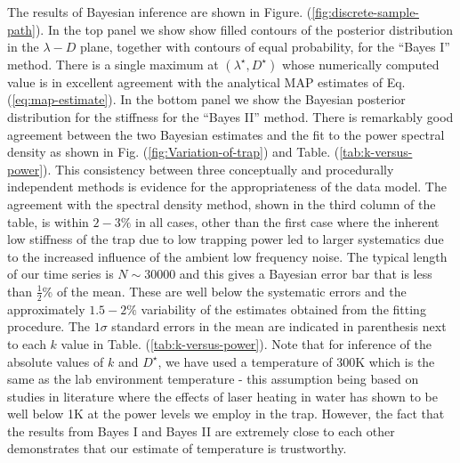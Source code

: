 \documentclass[english,aps, twocolumn, pre,superscriptaddress]{revtex4-1}
\begin{document}
The results of Bayesian inference are shown in Figure. (\ref{fig:discrete-sample-path}).
In the top panel we show show filled contours of the posterior distribution
in the $\lambda-D$ plane, together with contours of equal probability,
for the ``Bayes I'' method. There is a single maximum at $(\lambda^{\star},D^{\star})$
whose numerically computed value is in excellent agreement with the
analytical MAP estimates of Eq.(\ref{eq:map-estimate}). In the bottom
panel we show the Bayesian posterior distribution for the stiffness
for the ``Bayes II'' method. There is remarkably good agreement
between the two Bayesian estimates and the fit to the power spectral
density as shown in Fig. (\ref{fig:Variation-of-trap}) and Table.
(\ref{tab:k-versus-power}). This consistency between three conceptually
and procedurally independent methods is evidence for the appropriateness
of the data model. The agreement with the spectral density method,
shown in the third column of the table, is within $2-3\%$ in all
cases, other than the first case where the inherent low stiffness
of the trap due to low trapping power led to larger systematics due
to the increased influence of the ambient low frequency noise. The
typical length of our time series is $N\sim30000$ and this gives
a Bayesian error bar that is less than $\frac{1}{2}$\% of the mean.
These are well below the systematic errors and the approximately $1.5-2\%$
variability of the estimates obtained from the fitting procedure.
The $1\sigma$ standard errors in the mean are indicated in parenthesis
next to each $k$ value in Table. (\ref{tab:k-versus-power}). Note
that for inference of the absolute values of $k$ and $D^{\star}$,
we have used a temperature of 300K which is the same as the lab
environment temperature - this assumption being based on studies in
literature \cite{schmidt03heating}where the effects of laser heating
in water has shown to be well below 1K at the power levels we employ
in the trap. However, the fact that the results from Bayes I and Bayes
II are extremely close to each other demonstrates that our estimate
of temperature is trustworthy.
\end{document}
